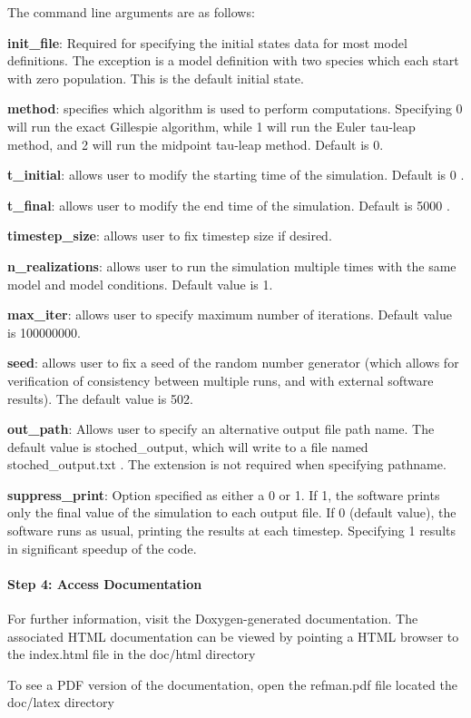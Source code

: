 The command line arguments are as follows\+:

{\bfseries init\+\_\+file}\+: Required for specifying the initial states data for most model definitions. The exception is a model definition with two species which each start with zero population. This is the default initial state.

{\bfseries method}\+: specifies which algorithm is used to perform computations. Specifying 0 will run the exact Gillespie algorithm, while 1 will run the Euler tau-\/leap method, and 2 will run the midpoint tau-\/leap method. Default is 0.

{\bfseries t\+\_\+initial}\+: allows user to modify the starting time of the simulation. Default is 0 .

{\bfseries t\+\_\+final}\+: allows user to modify the end time of the simulation. Default is 5000 .

{\bfseries timestep\+\_\+size}\+: allows user to fix timestep size if desired.

{\bfseries n\+\_\+realizations}\+: allows user to run the simulation multiple times with the same model and model conditions. Default value is 1.

{\bfseries max\+\_\+iter}\+: allows user to specify maximum number of iterations. Default value is 100000000.

{\bfseries seed}\+: allows user to fix a seed of the random number generator (which allows for verification of consistency between multiple runs, and with external software results). The default value is 502.

{\bfseries out\+\_\+path}\+: Allows user to specify an alternative output file path name. The default value is stoched\+\_\+output, which will write to a file named stoched\+\_\+output.\+txt . The extension is not required when specifying pathname.

{\bfseries suppress\+\_\+print}\+: Option specified as either a 0 or 1. If 1, the software prints only the final value of the simulation to each output file. If 0 (default value), the software runs as usual, printing the results at each timestep. Specifying 1 results in significant speedup of the code.

\paragraph*{Step 4\+: Access Documentation}

For further information, visit the Doxygen-\/generated documentation. The associated H\+T\+ML documentation can be viewed by pointing a H\+T\+ML browser to the index.\+html file in the doc/html directory

To see a P\+DF version of the documentation, open the refman.\+pdf file located the doc/latex directory 